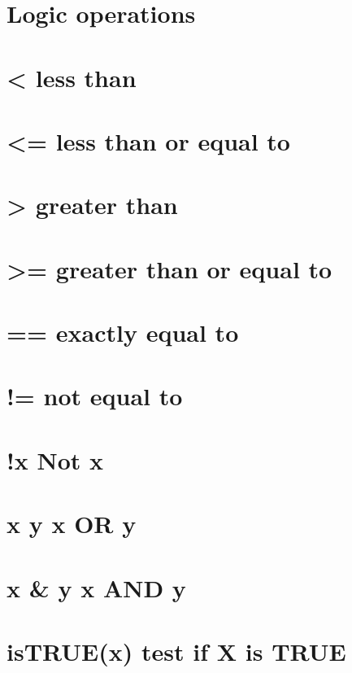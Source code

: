 \documentclass[]{article}
\begin{document}
\section{Logic operations}\label{logic-operations}

\section{\textless{} less than}\label{less-than}

\section{\textless{}= less than or equal
to}\label{less-than-or-equal-to}

\section{\textgreater{} greater than}\label{greater-than}

\section{\textgreater{}= greater than or equal
to}\label{greater-than-or-equal-to}

\section{== exactly equal to}\label{exactly-equal-to}

\section{!= not equal to}\label{not-equal-to}

\section{!x Not x}\label{x-not-x}

\section{x \textbar{} y x OR y}\label{x-y-x-or-y}

\section{x \& y x AND y}\label{x-y-x-and-y}

\section{isTRUE(x) test if X is TRUE}\label{istruex-test-if-x-is-true}
\end{document}
